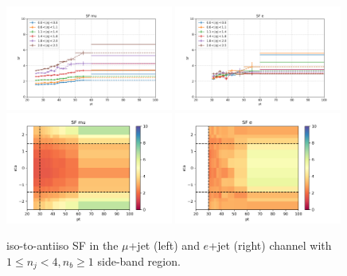 \begin{figure}
    \centering
    \includegraphics[width=0.49\textwidth]{chapters/Analysis/sectionBackground/figures/ljets_kinematics/123j1b/SF_mu_1d.png}
    \includegraphics[width=0.49\textwidth]{chapters/Analysis/sectionBackground/figures/ljets_kinematics/123j1b/SF_e_1d.png}
    \includegraphics[width=0.49\textwidth]{chapters/Analysis/sectionBackground/figures/ljets_kinematics/123j1b/SF_mu_2d.png}
    \includegraphics[width=0.49\textwidth]{chapters/Analysis/sectionBackground/figures/ljets_kinematics/123j1b/SF_e_2d.png}
    \caption{iso-to-antiiso SF in the $\mu$+jet (left) and $e$+jet (right) channel 
    with $1\leq n_j <4, n_b\geq1$ side-band region.}
    \label{fig:appendix:123j1b_sf}
\end{figure}




